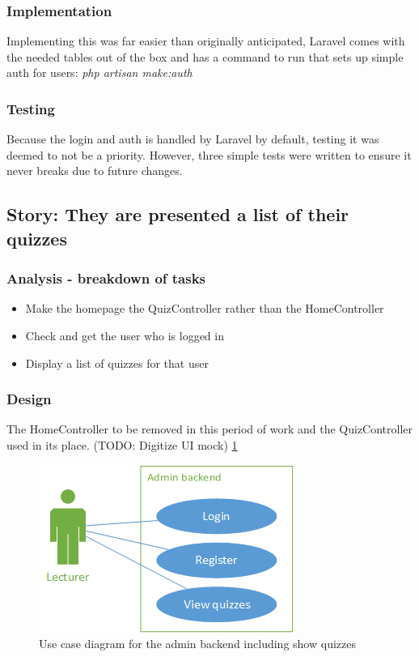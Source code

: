 \subsubsection{Implementation}
Implementing this was far easier than originally anticipated, Laravel comes with the needed tables out of the box and has a command to run that sets up simple auth for users: \textit{php artisan make:auth} 
\subsubsection{Testing}
Because the login and auth is handled by Laravel by default, testing it was deemed to not be a priority. However, three simple tests were written to ensure it never breaks due to future changes.
\newpage

\subsection{Story: They are presented a list of their quizzes}
\subsubsection{Analysis - breakdown of tasks}
\begin{itemize}
	\item Make the homepage the QuizController rather than the HomeController
	\item Check and get the user who is logged in
	\item Display a list of quizzes for that user
\end{itemize}
\subsubsection{Design}
The HomeController to be removed in this period of work and the QuizController used in its place. (TODO: Digitize UI mock) \ref{fig:quiz-list-use-case}

\begin{figure}
	\caption{Use case diagram for the admin backend including show quizzes}
	\centerline{\includegraphics{Chapter2/Iter-1/iter-1-use-case-v2}}
	\label{fig:quiz-list-use-case}
\end{figure}

